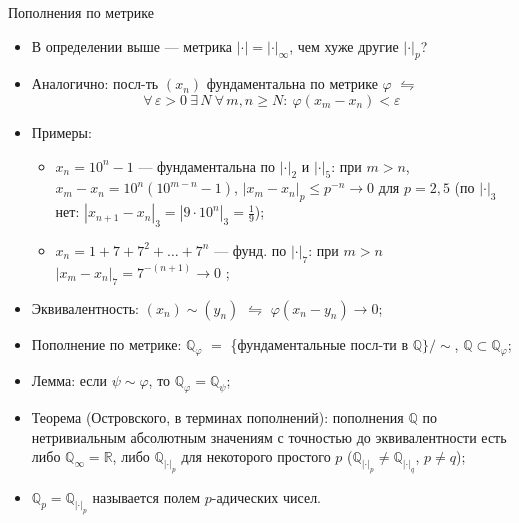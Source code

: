 \documentclass[serif, aspectratio=169]{beamer}
\begin{document}
\begin{frame}{Пополнения по метрике}
    \begin{itemize}
        \item В определении выше --- метрика $|\cdot|=|\cdot|_\infty$, чем хуже другие $|\cdot|_p$?
        \item Аналогично: посл-ть $(x_n)$ фундаментальна по метрике $\varphi$ $\leftrightharpoons$
        \[\forall\,\varepsilon>0\ \exists\, N\ \forall\, m,n\geqslant N:\ \varphi(x_m-x_n)<\varepsilon\]
        \item Примеры:
        \begin{itemize}
            \item $x_n=10^n-1$ --- фундаментальна по $|\cdot|_2$ и $|\cdot|_5$: при $m>n$, $x_m-x_n=10^n(10^{m-n}-1)$, $|x_m-x_n|_p\leqslant p^{-n}\to0$ для $p=2,5$ (по $|\cdot|_3$ нет: $|x_{n+1}-x_n|_3=|9\cdot10^n|_3=\frac19$);
            \item $x_n=1+7+7^2+\dots+7^n$ --- фунд. по $|\cdot|_7$: при $m>n$  $|x_m-x_n|_7=7^{-(n+1)}\to0$ ;
        \end{itemize}
        \item Эквивалентность: $(x_n)\sim(y_n)$ $\leftrightharpoons$ $\varphi(x_n-y_n)\to0$;
        \item Пополнение по метрике: $\mathbb{Q}_\varphi$ $=$ \{фундаментальные посл-ти в $\mathbb{Q}\}/{\sim}$, $\mathbb{Q}\subset\mathbb{Q}_\varphi$;
        \item Лемма: если $\psi\sim\varphi$, то $\mathbb{Q}_\varphi=\mathbb{Q}_\psi$;
        \item Теорема (Островского, в терминах пополнений): пополнения $\mathbb{Q}$ по нетривиальным абсолютным значениям с точностью до эквивалентности есть либо $\mathbb{Q}_\infty=\mathbb{R}$, либо $\mathbb{Q}_{|\cdot|_p}$ для некоторого простого $p$ ($\mathbb{Q}_{|\cdot|_p}\neq\mathbb{Q}_{|\cdot|_q}$, $p\neq q$); 
        \item $\mathbb{Q}_p=\mathbb{Q}_{|\cdot|_p}$ называется полем $p$-адических чисел.
    \end{itemize}
    
    \note{
        \begin{itemize}
            \item ---
        \end{itemize}
    }
\end{frame}
\end{document}
